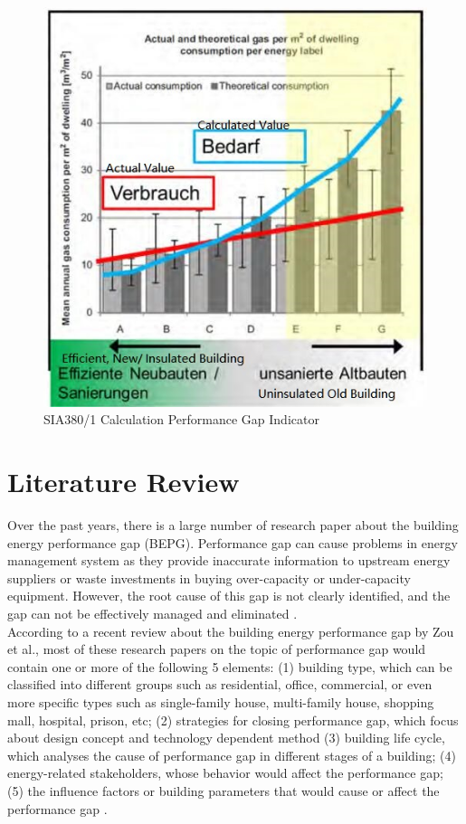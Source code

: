 \documentclass[a4paper, oneside]{discothesis}
\begin{document}
		\begin{figure}[!ht]
		\centering
		\includegraphics[scale=0.65]{SIA380Issue.jpg}
		\caption{SIA380/1 Calculation Performance Gap Indicator \cite{SIAPreviousreport}}
		\label{fig:SIA380PG}
		\end{figure}


\chapter{Literature Review}
	Over the past years, there is a large number of research paper about the building energy performance gap (BEPG). Performance gap can cause problems in energy management system as they provide inaccurate information to upstream energy suppliers or waste investments in buying over-capacity or under-capacity equipment. However, the root cause of this gap is not clearly identified, and the gap can not be effectively managed and eliminated \cite{FREI2017421}.\\
	
	According to a recent review about the building energy performance gap by Zou et al.\cite{ZOU2018165}, most of these research papers on the topic of performance gap would contain one or more of the following 5 elements: (1) building type, which can be classified into different groups such as residential, office, commercial, or even more specific types such as single-family house, multi-family house, shopping mall, hospital, prison, etc; (2) strategies for closing performance gap, which focus about design concept and technology dependent method (3) building life cycle, which analyses the cause of performance gap in different stages of a building; (4) energy-related stakeholders, whose behavior would affect the performance gap; (5) the influence factors or building parameters that would cause or affect the performance gap \cite{FREI2017421,ZOU2018165}.\\
	
\end{document}
